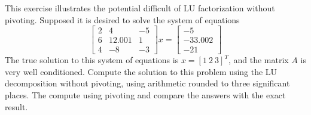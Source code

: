 \documentclass{homework}
\begin{document}
\begin{problem}[5-4]
 This exercise illustrates the potential difficult of LU factorization without pivoting. Supposed it is desired to solve the system of equations
 \[
   \begin{bmatrix}
     2 & 4 & -5 \\
     6 & 12.001 & 1 \\
     4 & -8 & -3
   \end{bmatrix}x=
   \begin{bmatrix}
     -5 \\
     -33.002 \\
     -21
   \end{bmatrix}
 \]
 The true solution to this system of equations is $x = [1\ 2\ 3]^T$, and the matrix $A$ is very well conditioned. Compute the solution to this problem using the LU decomposition without pivoting, using arithmetic rounded to three significant places. The compute using pivoting and compare the answers with the exact result.
\end{problem}
\end{document}
